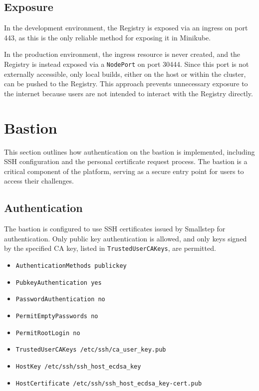 \subsection{Exposure}
In the development environment, the Registry is exposed via an ingress on port 443, as this is the only reliable method for exposing it in Minikube.

In the production environment, the ingress resource is never created, and the Registry is instead exposed via a \texttt{NodePort} on port 30444. Since this port is not externally accessible, only local builds, either on the host or within the cluster, can be pushed to the Registry. This approach prevents unnecessary exposure to the internet because users are not intended to interact with the Registry directly.

\section{Bastion}
This section outlines how authentication on the bastion is implemented, including SSH configuration and the personal certificate request process. The bastion is a critical component of the platform, serving as a secure entry point for users to access their challenges.

\subsection{Authentication}
The bastion is configured to use SSH certificates issued by Smallstep for authentication. Only public key authentication is allowed, and only keys signed by the specified CA key, listed in \texttt{TrustedUserCAKeys}, are permitted.

\begin{multicols}{2} 
    \begin{itemize}
        \item \texttt{AuthenticationMethods publickey}
        \item \texttt{PubkeyAuthentication yes}
        \item \texttt{PasswordAuthentication no}
        \item \texttt{PermitEmptyPasswords no}
        \item \texttt{PermitRootLogin no}
        \item \texttt{TrustedUserCAKeys /etc/ssh/\allowbreak ca\_user\_key.pub}
        \item \texttt{HostKey /etc/ssh/ssh\_host\allowbreak\_ecdsa\_key}
        \item \texttt{HostCertificate /etc/ssh/\allowbreak  ssh\_host\_ecdsa\_key-cert.pub}
    \end{itemize}
\end{multicols}

